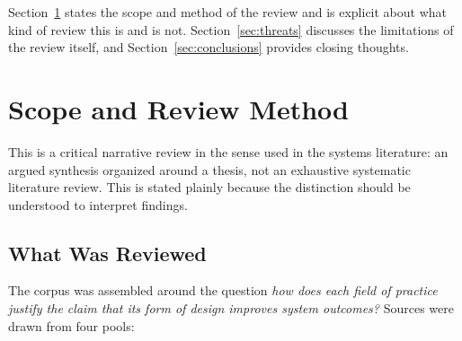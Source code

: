 \documentclass{csimq}
\begin{document}
Section~\ref{sec:method} states the scope and method of the review and is
explicit about what kind of review this is and is not.
Section~\ref{sec:threats} discusses the limitations of the review itself, and
Section~\ref{sec:conclusions} provides closing thoughts.

\section{Scope and Review Method}
\label{sec:method}

This is a critical narrative review in the sense used in the systems
literature: an argued synthesis organized around a thesis, not an exhaustive
systematic literature review. This is stated plainly because
the distinction should be understood to interpret findings.

\subsection{What Was Reviewed}

The corpus was assembled around the question \emph{how does each field of practice
justify the claim that its form of design improves system outcomes?} Sources
were drawn from four pools:
\end{document}
